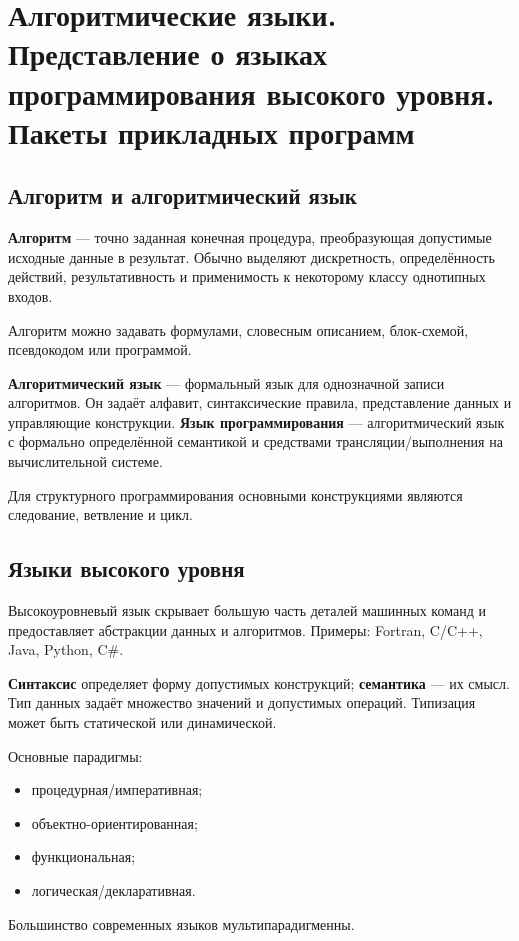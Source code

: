 \section{Алгоритмические языки. Представление о языках программирования высокого уровня. Пакеты прикладных программ}

\subsection{Алгоритм и алгоритмический язык}

\textbf{Алгоритм} --- точно заданная конечная процедура, преобразующая допустимые исходные данные в результат. Обычно выделяют дискретность, определённость действий, результативность и применимость к некоторому классу однотипных входов.

Алгоритм можно задавать формулами, словесным описанием, блок-схемой, псевдокодом или программой.

\textbf{Алгоритмический язык} --- формальный язык для однозначной записи алгоритмов. Он задаёт алфавит, синтаксические правила, представление данных и управляющие конструкции. \textbf{Язык программирования} --- алгоритмический язык с формально определённой семантикой и средствами трансляции/выполнения на вычислительной системе.

Для структурного программирования основными конструкциями являются следование, ветвление и цикл.

\subsection{Языки высокого уровня}

Высокоуровневый язык скрывает большую часть деталей машинных команд и предоставляет абстракции данных и алгоритмов. Примеры: Fortran, C/C++, Java, Python, C\#.

\textbf{Синтаксис} определяет форму допустимых конструкций; \textbf{семантика} --- их смысл. Тип данных задаёт множество значений и допустимых операций. Типизация может быть статической или динамической.

Основные парадигмы:
\begin{itemize}
\item процедурная/императивная;
\item объектно-ориентированная;
\item функциональная;
\item логическая/декларативная.
\end{itemize}
Большинство современных языков мультипарадигменны.

